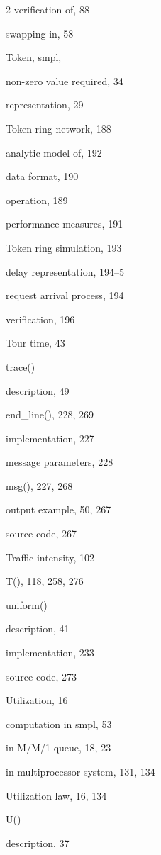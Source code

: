 \begin{multicols}{2}
\qquad verification of, 88\par
\quad swapping in, 58\par
\noindent Token, smpl,\par
\quad non-zero value required, 34\par
\quad representation, 29\par
\noindent Token ring network, 188\par
\quad analytic model of, 192\par
\quad data format, 190\par
\quad operation, 189\par
\quad performance measures, 191\par
\noindent Token ring simulation, 193\par
\quad delay representation, 194--5\par
\quad request arrival process, 194\par
\quad verification, 196\par
\noindent Tour time, 43\par
\noindent trace()\par
\quad description, 49\par
\quad end\_line(), 228, 269\par
\quad implementation, 227\par
\quad message parameters, 228\par
\quad msg(), 227, 268\par
\quad output example, 50, 267\par
\quad source code, 267\par
\noindent Traffic intensity, 102\par
\noindent T(), 118, 258, 276\par
\noindent uniform()\par
\quad description, 41\par
\quad implementation, 233\par
\quad source code, 273\par
\noindent Utilization, 16\par
\quad computation in smpl, 53\par
\quad in M/M/1 queue, 18, 23\par
\quad in multiprocessor system, 131, 134\par
\noindent Utilization law, 16, 134\par
\noindent U()\par
\quad description, 37\par

\end{multicols}
